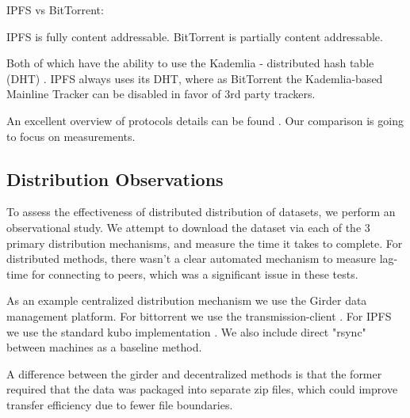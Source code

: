 \documentclass[10pt,twocolumn,letterpaper]{article}
\begin{document}
IPFS vs BitTorrent:

IPFS is fully content addressable.
BitTorrent is partially content addressable.

Both of which have the ability to use the Kademlia - distributed hash table (DHT) \cite{maymounkov_kademlia_2002}.
IPFS always uses its DHT, where as BitTorrent the Kademlia-based Mainline
Tracker can be disabled in favor of 3rd party trackers.

An excellent overview of protocols details can be found \cite{zebedee_comparing_2023}.
Our comparison is going to focus on measurements.




\subsection{Distribution Observations}

To assess the effectiveness of distributed distribution of datasets, we perform
an observational study. We attempt to download the dataset via each of the 3
primary distribution mechanisms, and measure the time it takes to complete.
For distributed methods, there wasn't a clear automated mechanism to measure
lag-time for connecting to peers, which was a significant issue in these tests.

As an example centralized distribution mechanism we use the Girder
\cite{girder_2024} data management platform.
For bittorrent we use the transmission-client \cite{transmission_2024}.
For IPFS we use the standard kubo implementation \cite{girder_2024}.
We also include direct "rsync" \cite{rsyncprojectrsync_2024} between machines as a baseline method.

A difference between the girder and decentralized methods is that the former
required that the data was packaged into separate zip files, which could
improve transfer efficiency due to fewer file boundaries.
\end{document}

